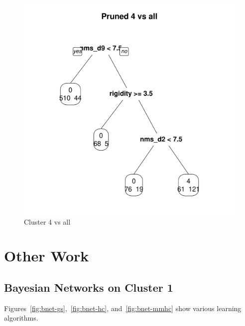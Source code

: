 \documentclass[letterpaper,12pt]{article}
\begin{document}
\begin{figure}[h]
  \centering
  \includegraphics[width=\linewidth]{dtree-4va-pruned.pdf}
  \caption{Cluster 4 vs all}
  \label{fig:4va}
\end{figure}
\section{Other Work}

\subsection{Bayesian Networks on Cluster 1}

Figures~\ref{fig:bnet-gs},~\ref{fig:bnet-hc}, and~\ref{fig:bnet-mmhc} show various
learning algorithms.
\end{document}
